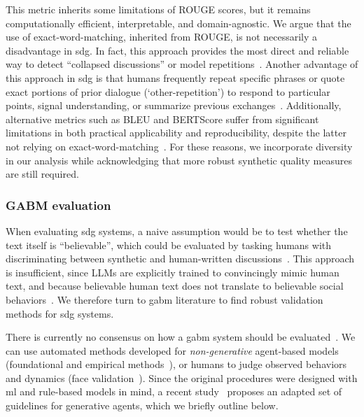 This metric inherits some limitations of ROUGE scores, but it remains computationally efficient, interpretable, and domain-agnostic. We argue that the use of exact-word-matching, inherited from ROUGE, is not necessarily a disadvantage in \ac{sdg}. In fact, this approach provides the most direct and reliable way to detect ``collapsed discussions'' or model repetitions~\cite{ulmer2024}. Another advantage of this approach in \ac{sdg} is that humans frequently repeat specific phrases or quote exact portions of prior dialogue (`other-repetition') to respond to particular points, signal understanding, or summarize previous exchanges~\cite{cannava2016repertoire, svennevig2004other,rossi2020other}. Additionally, alternative metrics such as BLEU and BERTScore suffer from significant limitations in both practical applicability and reproducibility, despite the latter not relying on exact-word-matching~\cite{post-2018-call,chen-etal-2022-reproducibility, hanna-bojar-2021-fine}. For these reasons, we incorporate diversity in our analysis while acknowledging that more robust synthetic quality measures are still required.



\subsubsection{GABM evaluation}
\label{sec:related:quality:gabm}

When evaluating \ac{sdg} systems, a naive assumption would be to test whether the text itself is ``believable'', which could be evaluated by tasking humans with discriminating between synthetic and human-written discussions~\cite{park_simulacra}. This approach is insufficient, since LLMs are explicitly trained to convincingly mimic human text, and because believable human text does not translate to believable social behaviors~\cite{rossi_2024}. We therefore turn to \ac{gabm} literature to find robust validation methods for \ac{sdg} systems.

There is currently no consensus on how a \ac{gabm} system should be evaluated~\cite{adornetto2025_gabms}. We can use automated methods developed for \emph{non-generative} agent-based models (foundational and empirical methods~\cite{collins2024}), or humans to judge observed behaviors and dynamics (face validation~\cite{rand2011_rigor}). Since the original procedures were designed with \ac{ml} and rule-based models in mind, a recent study~\cite{adornetto2025_gabms} proposes an adapted set of guidelines for generative agents, which we briefly outline below.


